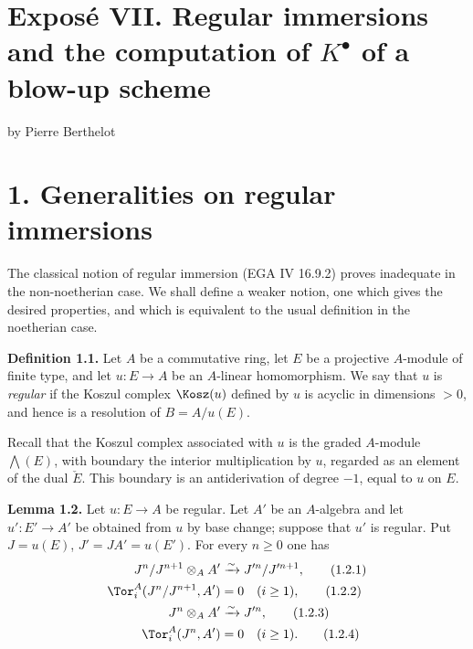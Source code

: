 \section*{Exposé VII. Regular immersions and the computation of \texorpdfstring{$K^\bullet$}{K} of a blow-up scheme}
\begin{center}
by Pierre Berthelot
\end{center}

\section*{1. Generalities on regular immersions}

The classical notion of regular immersion (EGA IV 16.9.2) proves inadequate in the non-noetherian case. We shall define a weaker notion, one which gives the desired properties, and which is equivalent to the usual definition in the noetherian case.

\textbf{Definition 1.1.} Let \(A\) be a commutative ring, let \(E\) be a projective \(A\)-module of finite type, and let \(u:E\to A\) be an \(A\)-linear homomorphism. We say that \(u\) is \emph{regular} if the Koszul complex \(\Kosz(u)\) defined by \(u\) is acyclic in dimensions \(>0\), and hence is a resolution of \(B=A/u(E)\).

Recall that the Koszul complex associated with \(u\) is the graded \(A\)-module \(\bigwedge(E)\), with boundary the interior multiplication by \(u\), regarded as an element of the dual \(\check E\). This boundary is an antiderivation of degree \(-1\), equal to \(u\) on \(E\).

\textbf{Lemma 1.2.} Let \(u:E\to A\) be regular. Let \(A'\) be an \(A\)-algebra and let \(u':E'\to A'\) be obtained from \(u\) by base change; suppose that \(u'\) is regular. Put \(J=u(E)\), \(J'=JA'=u(E')\). For every \(n\ge0\) one has
\begin{align}
 J^n/J^{n+1}\otimes_AA'&\xrightarrow{\sim}J'^n/J'^{n+1}, \tag{1.2.1}\\
 \Tor_i^A(J^n/J^{n+1},A')&=0\quad(i\ge1), \tag{1.2.2}\\
 J^n\otimes_AA'&\xrightarrow{\sim}J'^n, \tag{1.2.3}\\
 \Tor_i^A(J^n,A')&=0\quad(i\ge1). \tag{1.2.4}
\end{align}

